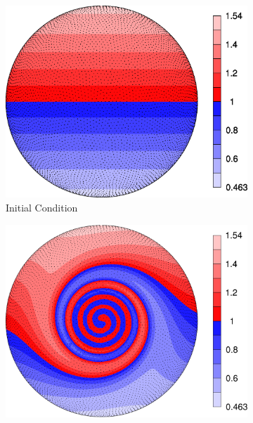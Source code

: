 \documentclass{report}
\begin{document}
\begin{figure}
\begin{center}
\begin{subfigure}[b]{0.49\textwidth}
	\centering
	\includegraphics[width=1.0\textwidth]{../figures/paper1/figures/vortex_rollup/vortexInitialCondition.eps}
	\caption{Initial Condition}
	\label{fig:vortex_initial}
\end{subfigure} 
\begin{subfigure}[b]{0.49\textwidth}
	\centering
	\includegraphics[width=1.0\textwidth]{../figures/paper1/figures/vortex_rollup/vortexComputedSolution-eps-converted-to.pdf}

\end{subfigure}
\end{center}
\end{figure}
\end{document}
